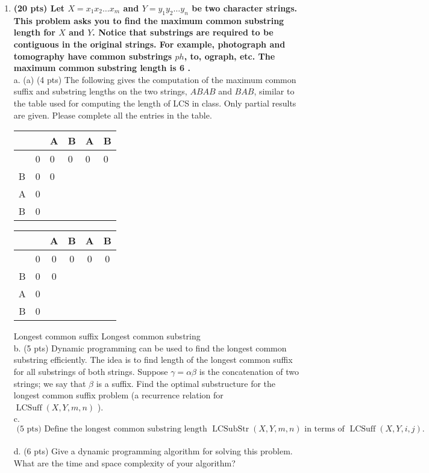 \documentclass[a4paper,11pt,oneside]{book}
\begin{document}
\begin{enumerate}
  \item {\textbf{(20 pts) Let $X=x_1 x_2 \ldots x_m$ and $Y=y_1 y_2 \ldots y_n$ be two character strings. This problem asks you to find the maximum common substring length for $X$ and $Y$. Notice that substrings are required to be contiguous in the original strings. For example, photograph and tomography have common substrings $p h$, to, ograph, etc. The maximum common substring length is 6 .}}
  \\ a. (a) (4 pts) The following gives the computation of the maximum common suffix and substring lengths on the two strings, $A B A B$ and $B A B$, similar to the table used for computing the length of LCS in class. Only partial results are given. Please complete all the entries in the table.
  \begin{tabular}{|l|l|l|l|l|l|}
  \hline & & A & B & A & B \\
  \hline & 0 & 0 & 0 & 0 & 0 \\
  \hline B & 0 & 0 & & & \\
  \hline A & 0 & & & & \\
  \hline B & 0 & & & & \\
  \hline
  \end{tabular}
  \begin{tabular}{|c|c|c|c|c|c|}
  \hline & & A & B & A & B \\
  \hline & 0 & 0 & 0 & 0 & 0 \\
  \hline B & 0 & 0 & & & \\
  \hline A & 0 & & & & \\
  \hline B & 0 & & & & \\
  \hline
  \end{tabular}
  Longest common suffix
  Longest common substring
  \\ b. (5 pts) Dynamic programming can be used to find the longest common substring efficiently. The idea is to find length of the longest common suffix for all substrings of both strings. Suppose $\gamma=\alpha \beta$ is the concatenation of two strings; we say that $\beta$ is a suffix. Find the optimal substructure for the longest common suffix problem (a recurrence relation for $\operatorname{LCSuff}(X, Y, m, n)$ ).
  \\ c. $$ \text { (5 pts) Define the longest common substring length } \operatorname{LCSubStr}(X, Y, m, n) \text { in terms of } \operatorname{LCSuff}(X, Y, i, j) \text {. } $$
  \\ d. (6 pts) Give a dynamic programming algorithm for solving this problem. What are the time and space complexity of your algorithm?



    
\end{enumerate}
\end{document}
